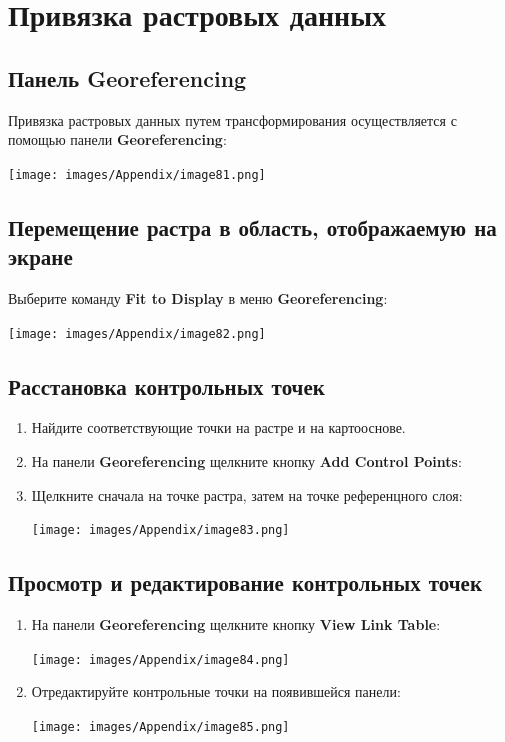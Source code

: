 \documentclass[12pt,]{book}
\begin{document}
\hypertarget{manual-georef}{%
\chapter{Привязка растровых данных}\label{manual-georef}}

\hypertarget{georeferencing}{%
\section{Панель Georeferencing}\label{georeferencing}}

Привязка растровых данных путем трансформирования осуществляется с помощью панели \textbf{Georeferencing}:

\texttt{[image: images/Appendix/image81.png]}

\hypertarget{section-42}{%
\section{Перемещение растра в область, отображаемую на экране}\label{section-42}}

Выберите команду \textbf{Fit to Display} в меню \textbf{Georeferencing}:

\texttt{[image: images/Appendix/image82.png]}

\hypertarget{section-43}{%
\section{Расстановка контрольных точек}\label{section-43}}

\begin{enumerate}
\def\labelenumi{\arabic{enumi}.}
\item
  Найдите соответствующие точки на растре и на картооснове.
\item
  На панели \textbf{Georeferencing} щелкните кнопку \textbf{Add Control Points}:
\item
  Щелкните сначала на точке растра, затем на точке референцного слоя:

  \texttt{[image: images/Appendix/image83.png]}
\end{enumerate}

\hypertarget{section-44}{%
\section{Просмотр и редактирование контрольных точек}\label{section-44}}

\begin{enumerate}
\def\labelenumi{\arabic{enumi}.}
\item
  На панели \textbf{Georeferencing} щелкните кнопку \textbf{View Link Table}:

  \texttt{[image: images/Appendix/image84.png]}
\item
  Отредактируйте контрольные точки на появившейся панели:

  \texttt{[image: images/Appendix/image85.png]}
\end{enumerate}
\end{document}
